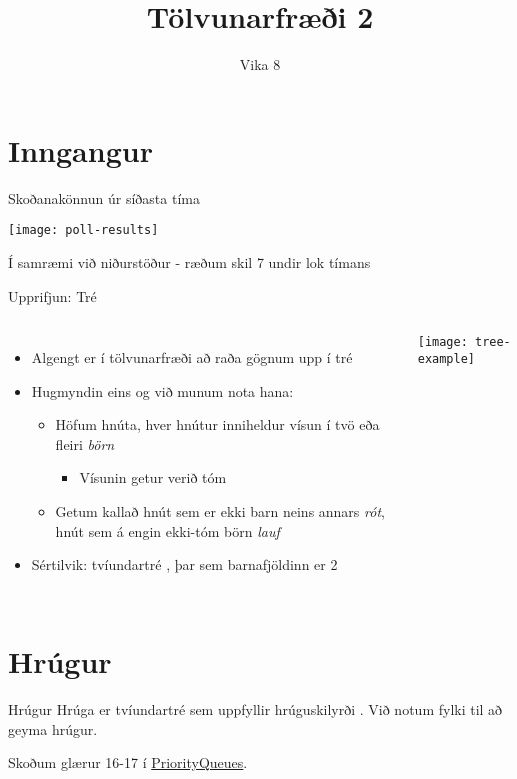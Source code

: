 \documentclass{beamer}
\title{Tölvunarfræði 2}
\subtitle{Vika 8}
\begin{document}
\begin{frame}
\titlepage
\end{frame}

\section{Inngangur}

\begin{frame}{Skoðanakönnun úr síðasta tíma}
\begin{center}
\texttt{[image: poll-results]}
\end{center}
Í samræmi við niðurstöður - ræðum skil 7 undir lok tímans
\end{frame}


\begin{frame}{Upprifjun: Tré}
\begin{columns}
\begin{itemize}
 \item Algengt er í tölvunarfræði að raða gögnum upp í tré
 \item Hugmyndin eins og við munum nota hana:
 \begin{itemize}
  \item Höfum hnúta, hver hnútur inniheldur vísun í tvö eða fleiri \emph{börn}
  \begin{itemize}
   \item Vísunin getur verið tóm
  \end{itemize}
  \item Getum kallað hnút sem er ekki barn neins annars \emph{rót}, hnút sem á engin ekki-tóm börn \emph{lauf}
 \end{itemize}
 \item Sértilvik: tvíundartré , þar sem barnafjöldinn er 2
\end{itemize}
\texttt{[image: tree-example]}
\end{columns}
\end{frame}


\section{Hrúgur}

\begin{frame}{Hrúgur}
Hrúga  er tvíundartré sem uppfyllir hrúguskilyrði . Við notum fylki til að geyma hrúgur.

Skoðum glærur 16-17 í \href{http://algs4.cs.princeton.edu/lectures/24PriorityQueues.pdf}{PriorityQueues}.
\end{frame}
\end{document}
